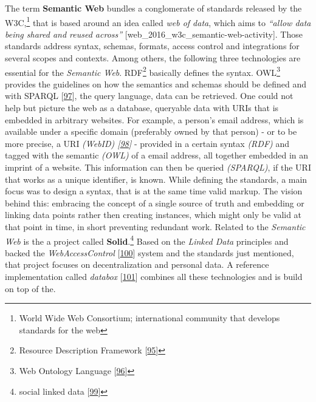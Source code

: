 \documentclass[12pt,english,a4paper,titlepage,cleardoublepage=empty,dottedtoc]{report}
\begin{document}
The term \textbf{\protect\hypertarget{link-semantic-web}{}{Semantic
Web}} bundles a conglomerate of standards released by the W3C,\footnote{World
  Wide Web Consortium; international community that develops standards
  for the web} that is based around an idea called \emph{web of data},
which aims to \emph{``allow data being shared and reused across''}
{[}web\_2016\_w3c\_semantic-web-activity{]}. Those standards address
syntax, schemas, formats, access control and integrations for several
scopes and contexts. Among others, the following three technologies are
essential for the \emph{Semantic Web}. RDF\footnote{Resource Description
  Framework {[}\protect\hyperlink{ref-web_w3c-tr_rdf}{95}{]}} basically
defines the syntax. OWL\footnote{Web Ontology Language
  {[}\protect\hyperlink{ref-web_w3c-tr_owl}{96}{]}} provides the
guidelines on how the semantics and schemas should be defined and with
\protect\hypertarget{link-sparql}{}{SPARQL}
{[}\protect\hyperlink{ref-web_w3c-tr_sparql}{97}{]}, the query language,
data can be retrieved. One could not help but picture the web as a
database, queryable data with URIs that is embedded in arbitrary
websites. For example, a person's email address, which is available
under a specific domain (preferably owned by that person) - or to be
more precise, a URI \emph{(WebID)
{[}\protect\hyperlink{ref-web_w3c-draft_webid}{98}{]}} - provided in a
certain syntax \emph{(RDF)} and tagged with the semantic \emph{(OWL)} of
a email address, all together embedded in an imprint of a website. This
information can then be queried \emph{(SPARQL)}, if the URI that works
as a unique identifier, is known. While defining the standards, a main
focus was to design a syntax, that is at the same time valid markup. The
vision behind this: embracing the concept of a single source of truth
and embedding or linking data points rather then creating instances,
which might only be valid at that point in time, in short preventing
redundant work. Related to the \emph{Semantic Web} is the a project
called \textbf{Solid}.\footnote{social linked data
  {[}\protect\hyperlink{ref-web_spec_solid}{99}{]}} Based on the
\emph{Linked Data} principles and backed the \emph{WebAccessControl}
{[}\protect\hyperlink{ref-web_2016_wiki_webaccesscontrol}{100}{]} system
and the standards just mentioned, that project focuses on
decentralization and personal data. A reference implementation called
\emph{databox} {[}\protect\hyperlink{ref-web_2016_demo_databox}{101}{]}
combines all these technologies and is build on top of the.
\end{document}
